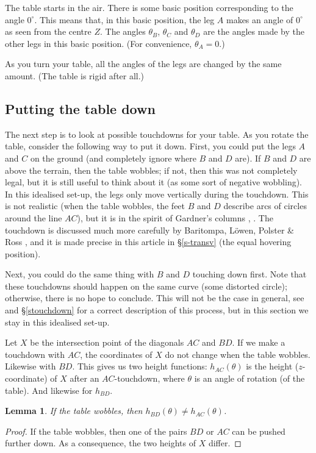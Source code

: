 \documentclass[a4paper,11pt,twoside,leqno]{article}
\newtheorem{lem}[teo]{Lemma}
\numberwithin{equation}{section}
\begin{document}
 The table starts in the air. There is some basic position corresponding to the angle $0^\circ$. This means that, in this basic position, the leg $A$ makes an angle of $0^\circ$ as seen from the centre $Z$. The angles $\theta_B$, $\theta_C$ and $\theta_D$ are the angles made by the other legs in this basic position. (For convenience, $\theta_A = 0$.)

 As you turn your table, all the angles of the legs are changed by the same amount. (The table is rigid after all.)

\subsection{Putting the table down}

The next step is to look at possible touchdowns for your table. 
As you rotate the table, consider the following way to put it down. 
First, you could put the legs $A$ and $C$ on the ground (and completely ignore where $B$ and $D$ are). 
If $B$ and $D$ are above the terrain, then the table wobbles; if not, then this was not completely legal, but it is still useful to think about it (as some sort of negative wobbling).
In this idealised set-up, the legs only move vertically during the touchdown. This is not realistic (when the table wobbles, the feet $B$ and $D$ describe arcs of circles around the line $AC$), but it is in the spirit of Gardner's columns \cite{Ga1}, \cite{Ga2}. The touchdown is discussed much more carefully by Baritompa, L\"owen, Polster \& Ross \cite{BLPR}, and it is made precise in this article in \S{}\ref{s-transv} (the equal hovering position).

Next, you could do the same thing with $B$ and $D$ touching down first.
Note that these touchdowns should happen on the same curve (some distorted circle); otherwise, there is no hope to conclude. 
This will not be the case in general, see \cite{BLPR} and \S{}\ref{stouchdown} for a correct description of this process, but in this section we stay in this idealised set-up.

Let $X$ be the intersection point of the diagonals $AC$ and $BD$. If we make a touchdown with $AC$, the coordinates of $X$ do not change when the table wobbles. 
Likewise with $BD$. 
This gives us two height functions: $h_{AC}(\theta)$ is the height ($z$-coordinate) of $X$ after an $AC$-touchdown, where $\theta$ is an angle of rotation (of the table). 
And likewise for $h_{BD}$.

\begin{lem}\label{lelem}
If the table wobbles, then $h_{BD}(\theta) \neq h_{AC}(\theta)$.
\end{lem}
\begin{proof}
If the table wobbles, then one of the pairs $BD$ or $AC$ can be pushed further down. As a consequence, the two heights of $X$ differ.
\end{proof}
\end{document}
